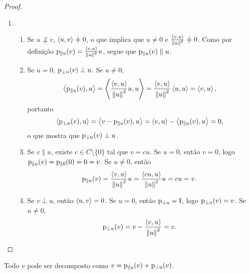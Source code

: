\begin{proof}
\begin{enumerate}
\begin{comment}
\end{comment}


	\item
		\begin{enumerate}
		\item Se $u \not\perp v$, $\inte{u}{v} \neq 0$, o que implica que $u \neq 0$ e $\frac{\inte{v}{u}}{\nor{u}^2} \neq 0$. Como por definição $\mathrm{p}_{\parallel u}(v) = \frac{\left\langle{v},{u}\right\rangle}{\left\Vert{u}\right\Vert^2}u$, segue que $\mathrm{p}_{\parallel u}(v) \parallel u$.

		\item Se $u = 0$, $\mathrm{p}_{\perp u}(v) \perp u$. Se $u \neq 0$,
	\begin{align*}
	\left\langle{\mathrm{p}_{\parallel u}(v)},{u}\right\rangle = \left\langle{\frac{\left\langle{v},{u}\right\rangle}{\left\Vert{u}\right\Vert^2}u},{u}\right\rangle = \frac{\left\langle{v},{u}\right\rangle}{\left\Vert{u}\right\Vert^2}\left\langle{u},{u}\right\rangle = \left\langle{v},{u}\right\rangle,
	\end{align*}
portanto
	\begin{align*}
	\left\langle{\mathrm{p}_{\perp u}(v)},{u}\right\rangle = \left\langle{v - \mathrm{p}_{\parallel u}(v)},{u}\right\rangle = \left\langle{v},{u}\right\rangle - \left\langle{\mathrm{p}_{\parallel u}(v)},{u}\right\rangle = 0,
	\end{align*}
o que mostra que $\mathrm{p}_{\perp u}(v) \perp u$.

		\item Se $v \parallel u$, existe $c \in C \setminus \{0\}$ tal que $v = cu$. Se $u = 0$, então $v=0$, logo $\mathrm{p}_{\parallel u}(v) = \mathrm{p}_{\parallel 0}(0) = 0 = v$. Se $u \neq 0$, então
		\begin{equation*}
		\mathrm{p}_{\parallel u}(v) = \frac{\left\langle{v},{u}\right\rangle}{\left\Vert{u}\right\Vert^2}u = \frac{\left\langle{cu},{u}\right\rangle}{\left\Vert{u}\right\Vert^2}u = cu = v.
		\end{equation*}

		\item Se $v \perp u$, então $\left\langle{u},{v}\right\rangle=0$. Se $u=0$, então $\mathrm{p}_{\perp u} = \mathrm{I}$, logo $\mathrm{p}_{\perp u}(v) = v$. Se $u \neq 0$,
	\begin{equation*}
	\mathrm{p}_{\perp u}(v) = v - \frac{\left\langle{v},{u}\right\rangle}{\left\Vert{u}\right\Vert^2} = v.
	\end{equation*}
		\end{enumerate}
	\end{enumerate}
\end{proof}

Todo $v$ pode ser decomposto como $v = \mathrm{p}_{\parallel u}(v) + \mathrm{p}_{\perp u}(v)$.

